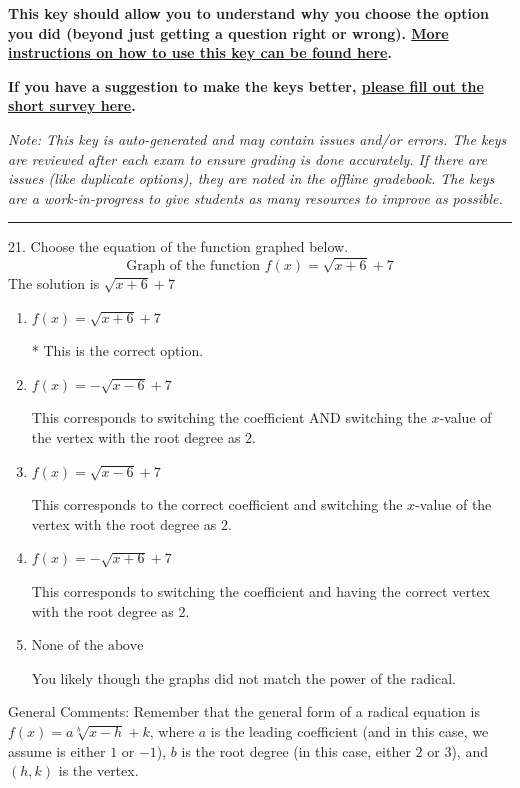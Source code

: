 \documentclass{article}[14pt]
\begin{document}
\textbf{This key should allow you to understand why you choose the option you did (beyond just getting a question right or wrong). \href{https://xronos.clas.ufl.edu/mac1105spring2020/courseDescriptionAndMisc/Exams/LearningFromResults}{More instructions on how to use this key can be found here}.}

\textbf{If you have a suggestion to make the keys better, \href{https://forms.gle/CZkbZmPbC9XALEE88}{please fill out the short survey here}.}

\textit{Note: This key is auto-generated and may contain issues and/or errors. The keys are reviewed after each exam to ensure grading is done accurately. If there are issues (like duplicate options), they are noted in the offline gradebook. The keys are a work-in-progress to give students as many resources to improve as possible.}

\rule{\textwidth}{0.4pt}

21. Choose the equation of the function graphed below.
$$ \text{Graph of the function } f(x) = \sqrt{x + 6} + 7 $$ 
The solution is $ \sqrt{x + 6} + 7 $ 

\begin{enumerate}[label=\Alph*.] 
\item $ f(x) = \sqrt{x + 6} + 7 $ 

 * This is the correct option. 
\item $ f(x) = - \sqrt{x - 6} + 7 $ 

 This corresponds to switching the coefficient AND switching the $x$-value of the vertex with the root degree as $2$. 
\item $ f(x) = \sqrt{x - 6} + 7 $ 

 This corresponds to the correct coefficient and switching the $x$-value of the vertex with the root degree as $2$. 
\item $ f(x) = - \sqrt{x + 6} + 7 $ 

 This corresponds to switching the coefficient and having the correct vertex with the root degree as $2$. 
\item $ \text{None of the above} $ 

 You likely though the graphs did not match the power of the radical. 
\end{enumerate} 
 
General Comments: Remember that the general form of a radical equation is $ f(x) = a \sqrt[b]{x - h} + k$, where $a$ is the leading coefficient (and in this case, we assume is either $1$ or $-1$), $b$ is the root degree (in this case, either $2$ or $3$), and $(h, k)$ is the vertex.
\end{document}
